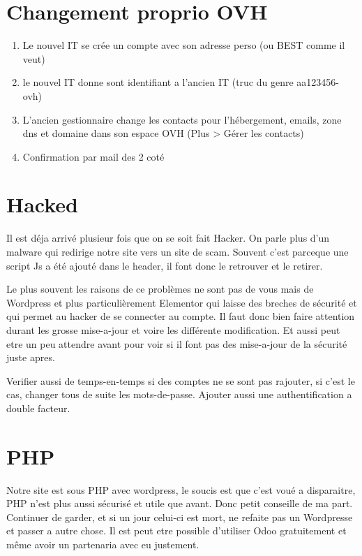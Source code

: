 \documentclass[12pt]{article}
\begin{document}
\section{Changement proprio OVH}
	\begin{enumerate}
		\item Le nouvel IT se crée un compte avec son adresse perso (ou BEST comme il veut)
		\item le nouvel IT donne sont identifiant a l'ancien IT (truc du genre aa123456-ovh)
		\item L’ancien gestionnaire change les contacts pour l’hébergement, emails, zone dns et domaine dans son espace OVH (Plus > Gérer les contacts)
		\item Confirmation par mail des 2 coté
	\end{enumerate}
	
\section{Hacked}	
	Il est déja arrivé plusieur fois que on se soit fait Hacker. On parle plus d'un malware qui redirige notre site vers un site de scam. Souvent c'est parceque une script Js a été ajouté dans le header, il font donc le retrouver et le retirer.

Le plus souvent les raisons de ce problèmes  ne sont pas de vous mais de Wordpress et plus particulièrement Elementor qui laisse des breches de sécurité et qui permet au hacker de se connecter au compte. Il faut donc bien faire attention durant les grosse mise-a-jour et voire les différente modification. Et aussi peut etre un peu attendre avant pour voir si il font pas des mise-a-jour de la sécurité juste apres.
	
	Verifier aussi de temps-en-temps si des comptes ne se sont pas rajouter, si c'est le cas, changer tous de suite les mots-de-passe. Ajouter aussi une authentification a double facteur.
	
\section{PHP}
	Notre site est sous PHP avec wordpress, le soucis est que c'est voué a disparaitre, PHP n'est plus aussi sécurisé et utile que avant. Donc petit conseille de ma part. Continuer de garder, et si un jour celui-ci est mort, ne refaite pas un Wordpresse et passer a autre chose. Il est peut etre possible d'utiliser Odoo gratuitement et même avoir un partenaria avec eu justement.
\end{document}
